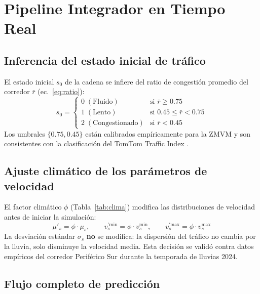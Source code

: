 \documentclass[11pt,a4paper]{article}
\begin{document}
\section{Pipeline Integrador en Tiempo Real}
\label{sec:pipeline}

\subsection{Inferencia del estado inicial de tráfico}

El estado inicial $s_0$ de la cadena se infiere del ratio de congestión promedio del corredor $\bar{r}$ (ec.~\eqref{eq:ratio}):
\begin{equation}
s_0 = \begin{cases}
0 \;(\text{Fluido}) & \text{si } \bar{r} \geq 0.75 \\
1 \;(\text{Lento}) & \text{si } 0.45 \leq \bar{r} < 0.75 \\
2 \;(\text{Congestionado}) & \text{si } \bar{r} < 0.45
\end{cases}
\label{eq:inferencia}
\end{equation}
Los umbrales $\{0.75, 0.45\}$ están calibrados empíricamente para la ZMVM y son consistentes con la clasificación del TomTom Traffic Index \cite{tomtomindex2024}.

\subsection{Ajuste climático de los parámetros de velocidad}

El factor climático $\phi$ (Tabla~\ref{tab:clima}) modifica las distribuciones de velocidad antes de iniciar la simulación:
\begin{equation}
\mu'_s = \phi \cdot \mu_s, \qquad v_s^{'\text{min}} = \phi \cdot v_s^\text{min}, \qquad v_s^{'\text{max}} = \phi \cdot v_s^\text{max}
\label{eq:ajusteclima}
\end{equation}
La desviación estándar $\sigma_s$ \textbf{no} se modifica: la dispersión del tráfico no cambia por la lluvia, solo disminuye la velocidad media. Esta decisión se validó contra datos empíricos del corredor Periférico Sur durante la temporada de lluvias 2024.

\subsection{Flujo completo de predicción}
\end{document}
